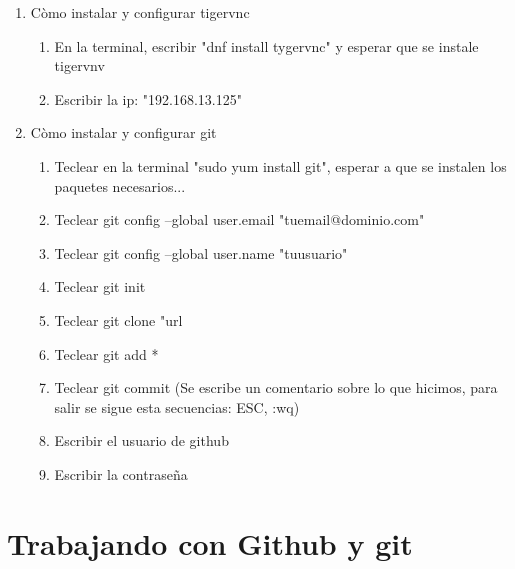 \documentclass{book}
\begin{document}
\begin{enumerate}
\begin{itemize}
		
	\end{itemize}%
	\item Còmo instalar y configurar tigervnc
	\begin{enumerate}
		\item En la terminal, escribir "dnf install tygervnc" y esperar que se instale tigervnv
		\item Escribir la ip: "192.168.13.125"
	\end{enumerate}
	\item Còmo instalar y configurar git
	\begin{enumerate}
		\item Teclear en la terminal "sudo yum install git", esperar a que se instalen los paquetes necesarios...
		\item Teclear  git config --global user.email "tuemail@dominio.com"
		\item Teclear  git config --global user.name "tuusuario"      
		\item Teclear  git init
		\item Teclear  git clone "url
		\item Teclear git add *
		\item Teclear git commit (Se escribe un comentario sobre lo que hicimos, para salir se sigue esta secuencias: ESC, :wq)
		\item Escribir el usuario de github
		\item Escribir la contraseña
	\end{enumerate}
	
	
	
	
	\end{enumerate}%



   \section{Trabajando con Github y git}%
\begin{flushright}
	\date{09 de enero de 2019}
\end{flushright}
   
\end{document}
